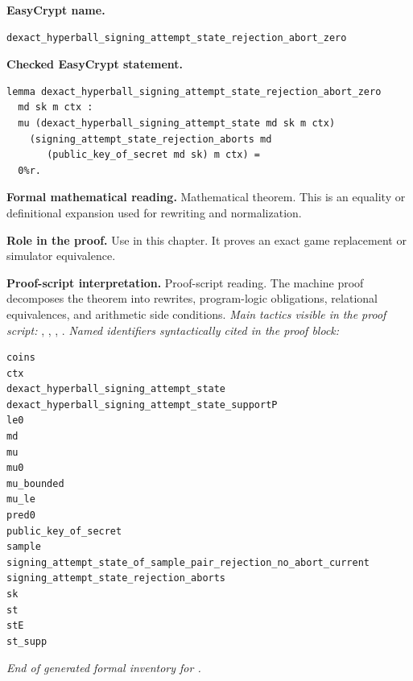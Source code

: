 \begin{formaltheorem}
\noindent\textbf{EasyCrypt name.}
\begin{lstlisting}[language=EasyCrypt,basicstyle=\ttfamily\scriptsize]
dexact_hyperball_signing_attempt_state_rejection_abort_zero
\end{lstlisting}
\noindent\textbf{Checked EasyCrypt statement.}
\begin{lstlisting}[language=EasyCrypt,basicstyle=\ttfamily\scriptsize]
lemma dexact_hyperball_signing_attempt_state_rejection_abort_zero
  md sk m ctx :
  mu (dexact_hyperball_signing_attempt_state md sk m ctx)
    (signing_attempt_state_rejection_aborts md
       (public_key_of_secret md sk) m ctx) =
  0%r.
\end{lstlisting}
\noindent\textbf{Formal mathematical reading.}
Mathematical theorem. This is an equality or definitional expansion used for rewriting and normalization.

\noindent\textbf{Role in the proof.}
Use in this chapter. It proves an exact game replacement or simulator equivalence.

\noindent\textbf{Proof-script interpretation.}
Proof-script reading. The machine proof decomposes the theorem into rewrites, program-logic obligations, relational equivalences, and arithmetic side conditions.
\emph{Main tactics visible in the proof script:} , , , .
\emph{Named identifiers syntactically cited in the proof block:}
\begin{lstlisting}[language=EasyCrypt,basicstyle=\ttfamily\scriptsize]
coins
ctx
dexact_hyperball_signing_attempt_state
dexact_hyperball_signing_attempt_state_supportP
le0
md
mu
mu0
mu_bounded
mu_le
pred0
public_key_of_secret
sample
signing_attempt_state_of_sample_pair_rejection_no_abort_current
signing_attempt_state_rejection_aborts
sk
st
stE
st_supp
\end{lstlisting}

\end{formaltheorem}

\medskip
\noindent\emph{End of generated formal inventory for .}

